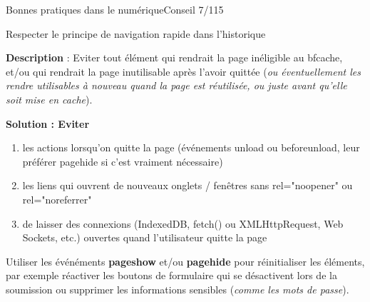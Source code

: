 \begin{frame}{Bonnes pratiques dans le numérique}{Conseil 7/115}

\begin{block}{Respecter le principe de navigation rapide dans l’historique}

\textbf{Description} :
Eviter tout élément qui rendrait la page inéligible au bfcache, et/ou qui rendrait la page inutilisable après l'avoir quittée (\textit{ou éventuellement les rendre utilisables à nouveau quand la page est réutilisée, ou juste avant qu'elle soit mise en cache}).

\textbf{Solution : Eviter} 
\begin{enumerate}
    \item les actions lorsqu'on quitte la page (événements unload ou beforeunload, leur préférer pagehide si c'est vraiment nécessaire)
    \item les liens qui ouvrent de nouveaux onglets / fenêtres sans rel="noopener" ou rel="noreferrer"
    \item de laisser des connexions (IndexedDB, fetch() ou XMLHttpRequest, Web Sockets, etc.) ouvertes quand l'utilisateur quitte la page
\end{enumerate}

Utiliser les événéments \textbf{pageshow} et/ou \textbf{pagehide} pour réinitialiser les éléments, par exemple réactiver les boutons de formulaire qui se désactivent lors de la soumission ou supprimer les informations sensibles (\textit{comme les mots de passe}).
\end{block}

\end{frame}



